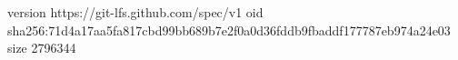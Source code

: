 version https://git-lfs.github.com/spec/v1
oid sha256:71d4a17aa5fa817cbd99bb689b7e2f0a0d36fddb9fbaddf177787eb974a24e03
size 2796344

